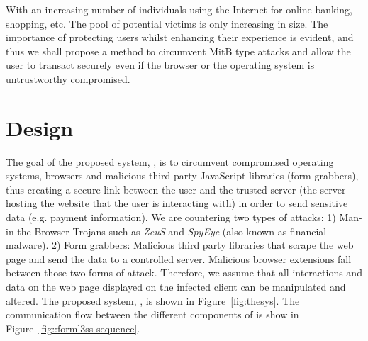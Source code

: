 With an increasing number of individuals using the Internet for online banking, shopping, etc. The pool of potential victims is only increasing in size. The importance of protecting users whilst enhancing their experience is evident, and thus we shall propose a method to circumvent MitB type attacks and allow the user to transact securely even if the browser or the operating system is untrustworthy compromised.

\section{Design}
\label{sec::forml3ss::design}

The goal of the proposed system, \formless, is to circumvent compromised operating systems, browsers and malicious third party JavaScript libraries (form grabbers), thus creating a secure link between the user and the trusted server (the server hosting the website that the user is interacting with) in order to send sensitive data (e.g. payment information). We are countering two types of attacks: 1) Man-in-the-Browser Trojans such as \textit{ZeuS} and \textit{SpyEye} (also known as financial malware). 2) Form grabbers: Malicious third party libraries that scrape the web page and send the data to a controlled server. Malicious browser extensions fall between those two forms of attack. Therefore, we assume that all interactions and data on the web page displayed on the infected client can be manipulated and altered. The proposed system, \formless, is shown in Figure~\ref{fig:thesys}. The communication flow between the different components of \formless is show in Figure~\ref{fig::forml3ss-sequence}.

